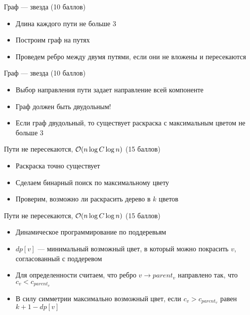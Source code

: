 \begin{frame}{Граф --- звезда (10 баллов)}
  \begin{itemize}
  \item Длина каждого пути не больше 3
  \item Построим граф на путях
  \item Проведем ребро между двумя путями, если они не вложены и пересекаются
  \end{itemize}
\end{frame}

\begin{frame}{Граф --- звезда (10 баллов)}
  \begin{itemize}
  \item Выбор направления пути задает направление всей компоненте
  \item Граф должен быть двудольным!
  \item Если граф двудольный, то существует раскраска с максимальным цветом не больше 3
  \end{itemize}
\end{frame}

\begin{frame}{Пути не пересекаются, $\mathcal{O}(n \log C \log n)$ (15 баллов)}
  \begin{itemize}
    \item Раскраска точно существует
    \item Сделаем бинарный поиск по максимальному цвету
    \item Проверим, возможно ли раскрасить дерево в $k$ цветов
  \end{itemize}
\end{frame}

\begin{frame}{Пути не пересекаются, $\mathcal{O}(n \log C \log n)$ (15 баллов)}
  \begin{itemize}
    \item Динамическое программирование по поддеревьям
    \item $dp[v]$ --- минимальный возможный цвет, в который можно покрасить $v$, согласованный с поддеревом
    \item Для определенности считаем, что ребро $v \rightarrow parent_v$ направлено так, что $c_v < c_{parent_v}$
    \item В силу симметрии максимально возможный цвет, если $c_v > c_{parent_v}$ равен $k + 1 - dp[v]$
  \end{itemize}
\end{frame}

